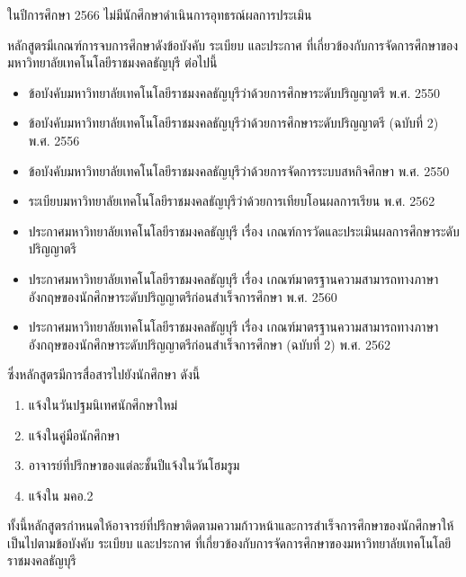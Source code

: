 ในปีการศึกษา 2566 ไม่มีนักศึกษาดำเนินการอุทธรณ์ผลการประเมิน 

\begin{doclist}
\end{doclist}



หลักสูตรมีเกณฑ์การจบการศึกษาดังข้อบังคับ ระเบียบ และประกาศ ที่เกี่ยวข้องกับการจัดการศึกษาของมหาวิทยาลัยเทคโนโลยีราชมงคลธัญบุรี ต่อไปนี้
\begin{itemize}
 \item ข้อบังคับมหาวิทยาลัยเทคโนโลยีราชมงคลธัญบุรีว่าด้วยการศึกษาระดับปริญญาตรี พ.ศ. 2550
\item	ข้อบังคับมหาวิทยาลัยเทคโนโลยีราชมงคลธัญบุรีว่าด้วยการศึกษาระดับปริญญาตรี (ฉบับที่ 2) พ.ศ. 2556
\item	ข้อบังคับมหาวิทยาลัยเทคโนโลยีราชมงคลธัญบุรีว่าด้วยการจัดการระบบสหกิจศึกษา พ.ศ. 2550
\item	ระเบียบมหาวิทยาลัยเทคโนโลยีราชมงคลธัญบุรีว่าด้วยการเทียบโอนผลการเรียน พ.ศ. 2562
\item	ประกาศมหาวิทยาลัยเทคโนโลยีราชมงคลธัญบุรี เรื่อง เกณฑ์การวัดและประเมินผลการศึกษาระดับปริญญาตรี
\item	ประกาศมหาวิทยาลัยเทคโนโลยีราชมงคลธัญบุรี เรื่อง เกณฑ์มาตรฐานความสามารถทางภาษาอังกฤษของนักศึกษาระดับปริญญาตรีก่อนสำเร็จการศึกษา พ.ศ. 2560
\item	ประกาศมหาวิทยาลัยเทคโนโลยีราชมงคลธัญบุรี เรื่อง เกณฑ์มาตรฐานความสามารถทางภาษาอังกฤษของนักศึกษาระดับปริญญาตรีก่อนสำเร็จการศึกษา (ฉบับที่ 2) พ.ศ. 2562
\end{itemize}
ซึ่งหลักสูตรมีการสื่อสารไปยังนักศึกษา ดังนี้
\begin{enumerate}
\item แจ้งในวันปฐมนิเทศนักศึกษาใหม่
\item แจ้งในคู่มือนักศึกษา
\item อาจารย์ที่ปรึกษาของแต่ละชั้นปีแจ้งในวันโฮมรูม
\item แจ้งใน มคอ.2
\end{enumerate}

ทั้งนี้หลักสูตรกำหนดให้อาจารย์ที่ปรึกษาติดตามความก้าวหน้าและการสำเร็จการศึกษาของนักศึกษาให้เป็นไปตามข้อบังคับ ระเบียบ และประกาศ ที่เกี่ยวข้องกับการจัดการศึกษาของมหาวิทยาลัยเทคโนโลยีราชมงคลธัญบุรี 
 
\begin{doclist}
\end{doclist}

